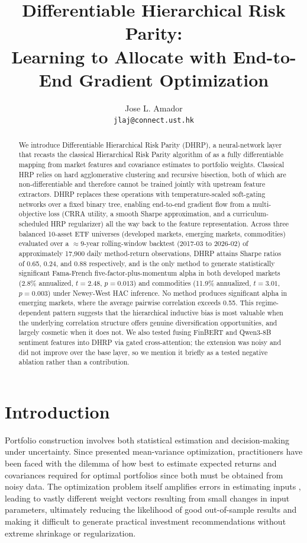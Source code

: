 \documentclass{article}
\title{Differentiable Hierarchical Risk Parity:\\Learning to Allocate with End-to-End Gradient Optimization}
\author{
  Jose L. Amador \\
  \texttt{jlaj@connect.ust.hk}
}
\begin{document}
\maketitle

\begin{abstract}
We introduce Differentiable Hierarchical Risk Parity (DHRP), a neural-network layer that recasts the classical Hierarchical Risk Parity algorithm of \citet{LopezdePrado2016} as a fully differentiable mapping from market features and covariance estimates to portfolio weights. Classical HRP relies on hard agglomerative clustering and recursive bisection, both of which are non-differentiable and therefore cannot be trained jointly with upstream feature extractors. DHRP replaces these operations with temperature-scaled soft-gating networks over a fixed binary tree, enabling end-to-end gradient flow from a multi-objective loss (CRRA utility, a smooth Sharpe approximation, and a curriculum-scheduled HRP regularizer) all the way back to the feature representation. Across three balanced 10-asset ETF universes (developed markets, emerging markets, commodities) evaluated over a $\approx 9$-year rolling-window backtest (2017-03 to 2026-02) of approximately 17{,}900 daily method-return observations, DHRP attains Sharpe ratios of 0.65, 0.24, and 0.88 respectively, and is the only method to generate statistically significant Fama-French five-factor-plus-momentum alpha in both developed markets (2.8\% annualized, $t=2.48$, $p=0.013$) and commodities (11.9\% annualized, $t=3.01$, $p=0.003$) under Newey-West HAC inference. No method produces significant alpha in emerging markets, where the average pairwise correlation exceeds 0.55. This regime-dependent pattern suggests that the hierarchical inductive bias is most valuable when the underlying correlation structure offers genuine diversification opportunities, and largely cosmetic when it does not. We also tested fusing FinBERT and Qwen3-8B sentiment features into DHRP via gated cross-attention; the extension was noisy and did not improve over the base layer, so we mention it briefly as a tested negative ablation rather than a contribution.
\end{abstract}

\section{Introduction}

Portfolio construction involves both statistical estimation and decision-making under uncertainty. Since \citet{Markowitz1952} presented mean-variance optimization, practitioners have been faced with the dilemma of how best to estimate expected returns and covariances required for optimal portfolios since both must be obtained from noisy data. The optimization problem itself amplifies errors in estimating inputs \citep{Ledoit2004, DeMiguel2009}, leading to vastly different weight vectors resulting from small changes in input parameters, ultimately reducing the likelihood of good out-of-sample results and making it difficult to generate practical investment recommendations without extreme shrinkage or regularization.
\end{document}
